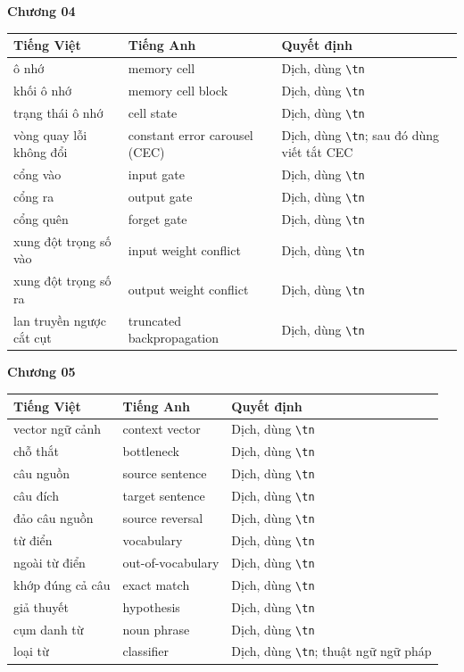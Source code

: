 \bigskip
\textbf{Chương 04}

\footnotesize
\begin{tabular}{@{}llp{4cm}@{}}
\toprule
Tiếng Việt & Tiếng Anh & Quyết định \\
\midrule
ô nhớ & memory cell & Dịch, dùng \texttt{\textbackslash tn} \\
khối ô nhớ & memory cell block & Dịch, dùng \texttt{\textbackslash tn} \\
trạng thái ô nhớ & cell state & Dịch, dùng \texttt{\textbackslash tn} \\
vòng quay lỗi không đổi & constant error carousel (CEC) & Dịch, dùng \texttt{\textbackslash tn}; sau đó dùng viết tắt CEC \\
cổng vào & input gate & Dịch, dùng \texttt{\textbackslash tn} \\
cổng ra & output gate & Dịch, dùng \texttt{\textbackslash tn} \\
cổng quên & forget gate & Dịch, dùng \texttt{\textbackslash tn} \\
xung đột trọng số vào & input weight conflict & Dịch, dùng \texttt{\textbackslash tn} \\
xung đột trọng số ra & output weight conflict & Dịch, dùng \texttt{\textbackslash tn} \\
lan truyền ngược cắt cụt & truncated backpropagation & Dịch, dùng \texttt{\textbackslash tn} \\
\bottomrule
\end{tabular}
\normalsize

\bigskip
\textbf{Chương 05}

\footnotesize
\begin{tabular}{@{}llp{4cm}@{}}
\toprule
Tiếng Việt & Tiếng Anh & Quyết định \\
\midrule
vector ngữ cảnh & context vector & Dịch, dùng \texttt{\textbackslash tn} \\
chỗ thắt & bottleneck & Dịch, dùng \texttt{\textbackslash tn} \\
câu nguồn & source sentence & Dịch, dùng \texttt{\textbackslash tn} \\
câu đích & target sentence & Dịch, dùng \texttt{\textbackslash tn} \\
đảo câu nguồn & source reversal & Dịch, dùng \texttt{\textbackslash tn} \\
từ điển & vocabulary & Dịch, dùng \texttt{\textbackslash tn} \\
ngoài từ điển & out-of-vocabulary & Dịch, dùng \texttt{\textbackslash tn} \\
khớp đúng cả câu & exact match & Dịch, dùng \texttt{\textbackslash tn} \\
giả thuyết & hypothesis & Dịch, dùng \texttt{\textbackslash tn} \\
cụm danh từ & noun phrase & Dịch, dùng \texttt{\textbackslash tn} \\
loại từ & classifier & Dịch, dùng \texttt{\textbackslash tn}; thuật ngữ ngữ pháp \\
\bottomrule
\end{tabular}
\normalsize

